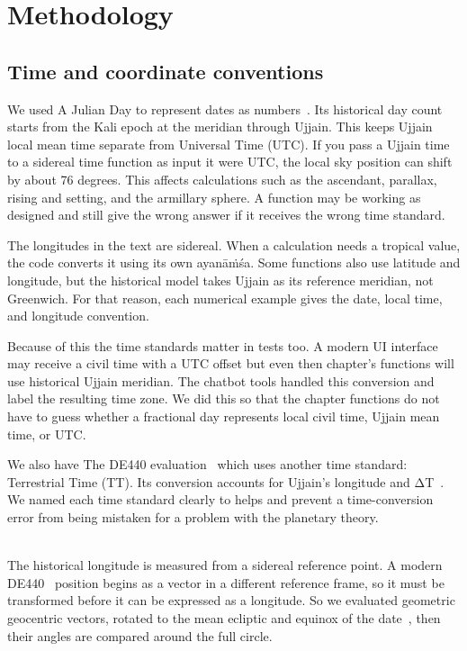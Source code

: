 \documentclass[12pt,a4paper,oneside]{report}
\begin{document}
\chapter{Methodology}

\section{Time and coordinate conventions}

We used A Julian Day to represent dates as numbers~\cite{meeus1998}. Its historical day count starts from the Kali epoch at the meridian through Ujjain. This keeps Ujjain local mean time separate from Universal Time (UTC). If you pass a Ujjain time to a sidereal time function as input it were UTC, the local sky position can shift by about 76 degrees. This affects calculations such as the ascendant, parallax, rising and setting, and the armillary sphere. A function may be working as designed and still give the wrong answer if it receives the wrong time standard.

The longitudes in the text are sidereal. When a calculation needs a tropical value, the code converts it using its own ayanāṁśa. Some functions also use latitude and longitude, but the historical model takes Ujjain as its reference meridian, not Greenwich. For that reason, each numerical example gives the date, local time, and longitude convention.

Because of this the time standards matter in tests too. A modern UI interface may receive a civil time with a UTC offset but even then chapter's functions will use historical Ujjain meridian. The chatbot tools handled this conversion and label the resulting time zone. We did this so that the chapter functions do not have to guess whether a fractional day represents local civil time, Ujjain mean time, or UTC.

We also have The DE440 evaluation~\cite{Park2021DE440} which uses another time standard: Terrestrial Time (TT). Its conversion accounts for Ujjain's longitude and ΔT~\cite{morrison2004,espenak2006}. We named each time standard clearly to helps and prevent a time-conversion error from being mistaken for a problem with the planetary theory.\\
\strut \\
The historical longitude is measured from a sidereal reference point. A modern DE440~\cite{Park2021DE440} position begins as a vector in a different reference frame, so it must be transformed before it can be expressed as a longitude. So we evaluated geometric geocentric vectors, rotated to the mean ecliptic and equinox of the date~\cite{capitaine2003,hilton2006}, then their angles are compared around the full circle.
\end{document}
